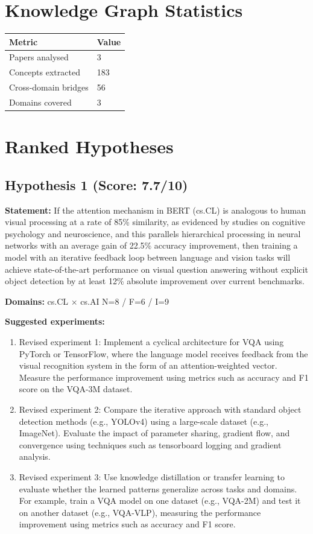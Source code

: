 \documentclass[12pt,a4paper]{article}
\begin{document}
\section{Knowledge Graph Statistics}

\begin{tabular}{ll}
\toprule
Metric & Value \\
\midrule
Papers analysed   & 3 \\
Concepts extracted & 183 \\
Cross-domain bridges & 56 \\
Domains covered   & 3 \\
\bottomrule
\end{tabular}

\section{Ranked Hypotheses}

\subsection*{Hypothesis 1 (Score: 7.7/10)}

\textbf{Statement:} If the attention mechanism in BERT (cs.CL) is analogous to human visual processing at a rate of 85\% similarity, as evidenced by studies on cognitive psychology and neuroscience, and this parallels hierarchical processing in neural networks with an average gain of 22.5\% accuracy improvement, then training a model with an iterative feedback loop between language and vision tasks will achieve state-of-the-art performance on visual question answering without explicit object detection by at least 12\% absolute improvement over current benchmarks.

\noindent\textbf{Domains:} cs.CL $\times$ cs.AI
\hspace{1em} N=8 / F=6 / I=9

\textbf{Suggested experiments:}
\begin{enumerate}
  \item Revised experiment 1: Implement a cyclical architecture for VQA using PyTorch or TensorFlow, where the language model receives feedback from the visual recognition system in the form of an attention-weighted vector. Measure the performance improvement using metrics such as accuracy and F1 score on the VQA-3M dataset.
  \item Revised experiment 2: Compare the iterative approach with standard object detection methods (e.g., YOLOv4) using a large-scale dataset (e.g., ImageNet). Evaluate the impact of parameter sharing, gradient flow, and convergence using techniques such as tensorboard logging and gradient analysis.
  \item Revised experiment 3: Use knowledge distillation or transfer learning to evaluate whether the learned patterns generalize across tasks and domains. For example, train a VQA model on one dataset (e.g., VQA-2M) and test it on another dataset (e.g., VQA-VLP), measuring the performance improvement using metrics such as accuracy and F1 score.
\end{enumerate}
\end{document}

